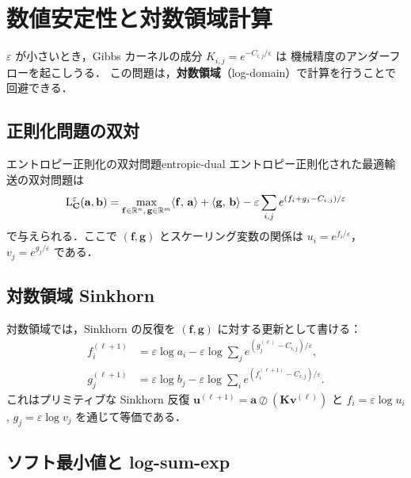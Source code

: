 \section{数値安定性と対数領域計算}
\label{sec:log-domain}

$\varepsilon$ が小さいとき，Gibbs カーネルの成分 $K_{i,j} = e^{-C_{i,j}/\varepsilon}$ は
機械精度のアンダーフローを起こしうる．
この問題は，\textbf{対数領域}（log-domain）で計算を行うことで回避できる．

\subsection{正則化問題の双対}

\begin{proposition}{エントロピー正則化の双対問題}{entropic-dual}
  エントロピー正則化された最適輸送の双対問題は
  \[
    \mathrm{L}_{\mathbf{C}}^\varepsilon(\mathbf{a}, \mathbf{b})
    = \max_{\mathbf{f} \in \mathbb{R}^n,\, \mathbf{g} \in \mathbb{R}^m}
    \langle \mathbf{f},\, \mathbf{a} \rangle + \langle \mathbf{g},\, \mathbf{b} \rangle
    - \varepsilon \sum_{i,j} e^{(f_i + g_j - C_{i,j})/\varepsilon}
  \]
  で与えられる．ここで $(\mathbf{f}, \mathbf{g})$ とスケーリング変数の関係は
  $u_i = e^{f_i/\varepsilon}$，$v_j = e^{g_j/\varepsilon}$ である．
\end{proposition}

\subsection{対数領域 Sinkhorn}

対数領域では，Sinkhorn の反復を $(\mathbf{f}, \mathbf{g})$ に対する更新として書ける：
\begin{align*}
  f_i^{(\ell+1)}
    &= \varepsilon \log a_i - \varepsilon \log \sum_j e^{(g_j^{(\ell)} - C_{i,j})/\varepsilon},
  \\
  g_j^{(\ell+1)}
    &= \varepsilon \log b_j - \varepsilon \log \sum_i e^{(f_i^{(\ell+1)} - C_{i,j})/\varepsilon}.
\end{align*}
これはプリミティブな Sinkhorn 反復
$\mathbf{u}^{(\ell+1)} = \mathbf{a} \oslash (\mathbf{K}\mathbf{v}^{(\ell)})$ と
$f_i = \varepsilon \log u_i$, $g_j = \varepsilon \log v_j$ を通じて等価である．

\subsection{ソフト最小値と log-sum-exp}

